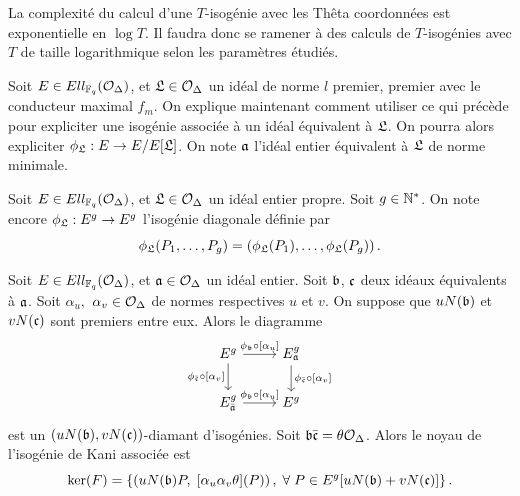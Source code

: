 \begin{Rem}
	La complexité du calcul d'une $T$-isogénie avec les Thêta coordonnées est exponentielle en $\log T$. Il faudra donc se ramener à des calculs de $T$-isogénies avec $T$ de taille logarithmique selon les paramètres étudiés. 
\end{Rem}

Soit $E\in Ell_{\mathbb{F}_{q}}(\mathcal{O}_{\Delta})$, et $\mathfrak{L}\in\mathcal{O}_{\Delta}$ un idéal de norme $l$ premier, premier avec le conducteur maximal $f_m$. On explique maintenant comment utiliser ce qui précède pour expliciter une isogénie associée à un idéal équivalent à $\mathfrak{L}$. On pourra alors expliciter $\phi_{\mathfrak{L}} : E\rightarrow E/E[\mathfrak{L}]$. On note $\mathfrak{a}$ l'idéal entier équivalent à $\mathfrak{L}$ de norme minimale.

\begin{Def}
	Soit $E\in Ell_{\mathbb{F}_{q}}(\mathcal{O}_{\Delta})$, et $\mathfrak{L}\in\mathcal{O}_{\Delta}$ un idéal entier propre. Soit $g\in\mathbb{N}^*$. On note encore $\phi_{\mathfrak{L}} : E^g\rightarrow E^g$ l'isogénie diagonale définie par
	\begin{equation*}
		\phi_{\mathfrak{L}}(P_1,\ldots,P_g) = \left( \phi_{\mathfrak{L}}(P_1), \ldots, \phi_{\mathfrak{L}}(P_g)\right). 
	\end{equation*}

\end{Def}

\begin{Prop}
	Soit $E\in Ell_{\mathbb{F}_{q}}(\mathcal{O}_{\Delta})$, et $\mathfrak{a}\in\mathcal{O}_{\Delta}$ un idéal entier. Soit $\mathfrak{b}$, $\mathfrak{c}$ deux idéaux équivalents à $\mathfrak{a}$. Soit $\alpha_u,$ $\alpha_v\in\mathcal{O}_{\Delta}$ de normes respectives $u$ et $v$. On suppose que $uN(\mathfrak{b})$ et $vN(\mathfrak{c})$ sont premiers entre eux. Alors le diagramme
	\[\begin{tikzcd}
		E^g\arrow{r}{\phi_\bR\circ[\alpha_{u}]} \arrow[swap]{d}{\phi_{\bar{\cR}}\circ[\alpha_{v}]} & E^g_\aR \arrow{d}{\phi_{\bar{\cR}}\circ[\alpha_{v}]} \\
		E^g_{\bar{\aR}} \arrow{r}{\phi_\bR\circ[\alpha_{u}]} & E^g
	\end{tikzcd}
	\]
	est un $(uN(\mathfrak{b}),vN(\mathfrak{c}))$-diamant d'isogénies. Soit $\mathfrak{b}\bar{\mathfrak{c}} = \theta\mathcal{O}_{\Delta}$. Alors le noyau de l'isogénie de Kani associée est 
	\begin{equation*}
		\ker(F)=\left\lbrace \left( uN(\mathfrak{b})P,\;[\alpha_{u}\alpha_{v}\theta](P)\right),\;\forall\; P\in E^g[uN(\mathfrak{b}) + vN(\mathfrak{c})] \right\rbrace .
	\end{equation*}
\end{Prop}

